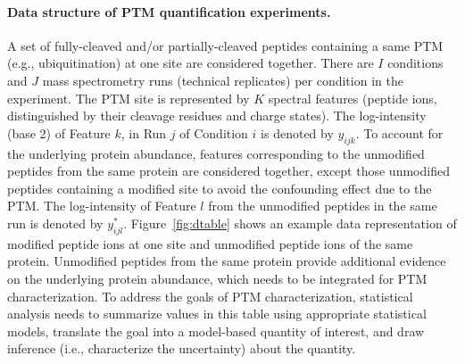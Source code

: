 \documentclass{mcp}
\def\sfigref#1{{Figure~\ref{#1}}}
\begin{document}
\paragraph{Data structure of PTM quantification experiments.}
A set of fully-cleaved and/or partially-cleaved peptides containing a same PTM (e.g., ubiquitination) at one site are considered together. There are $I$ conditions and $J$ mass spectrometry runs (technical replicates) per condition in the experiment. The PTM site is represented by $K$ spectral features (peptide ions, distinguished by their cleavage residues and charge states). The log-intensity (base 2) of Feature $k$, in Run $j$ of Condition $i$ is denoted by $y_{ijk}$. To account for the underlying protein abundance, features corresponding to the unmodified peptides from the same protein are considered together, except those unmodified peptides containing a modified site to avoid the confounding effect due to the PTM. The log-intensity of Feature $l$ from the unmodified peptides in the same run is denoted by $y_{ijl}^{\ast}$. \sfigref{fig:dtable} shows an example data representation of modified peptide ions at one site and unmodified peptide ions of the same protein. Unmodified peptides from the same protein provide additional evidence on the underlying protein abundance, which needs to be integrated for PTM characterization. To address the goals of PTM characterization, statistical analysis needs to summarize values in this table using appropriate statistical models, translate the goal into a model-based quantity of interest, and draw inference (i.e., characterize the uncertainty) about the quantity. 
\end{document}
